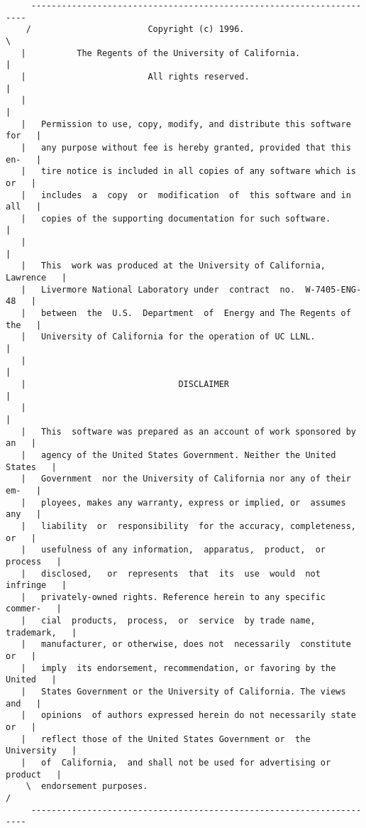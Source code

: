 \begin{verbatim}
     ---------------------------------------------------------------------  
    /                       Copyright (c) 1996.                           \ 
   |          The Regents of the University of California.                 |
   |                        All rights reserved.                           |
   |                                                                       |
   |   Permission to use, copy, modify, and distribute this software for   |
   |   any purpose without fee is hereby granted, provided that this en-   |
   |   tire notice is included in all copies of any software which is or   |
   |   includes  a  copy  or  modification  of  this software and in all   |
   |   copies of the supporting documentation for such software.           |
   |                                                                       |
   |   This  work was produced at the University of California, Lawrence   |
   |   Livermore National Laboratory under  contract  no.  W-7405-ENG-48   |
   |   between  the  U.S.  Department  of  Energy and The Regents of the   |
   |   University of California for the operation of UC LLNL.              |
   |                                                                       |
   |                              DISCLAIMER                               |
   |                                                                       |
   |   This  software was prepared as an account of work sponsored by an   |
   |   agency of the United States Government. Neither the United States   |
   |   Government  nor the University of California nor any of their em-   |
   |   ployees, makes any warranty, express or implied, or  assumes  any   |
   |   liability  or  responsibility  for the accuracy, completeness, or   |
   |   usefulness of any information,  apparatus,  product,  or  process   |
   |   disclosed,   or  represents  that  its  use  would  not  infringe   |
   |   privately-owned rights. Reference herein to any specific  commer-   |
   |   cial  products,  process,  or  service  by trade name, trademark,   |
   |   manufacturer, or otherwise, does not  necessarily  constitute  or   |
   |   imply  its endorsement, recommendation, or favoring by the United   |
   |   States Government or the University of California. The views  and   |
   |   opinions  of authors expressed herein do not necessarily state or   |
   |   reflect those of the United States Government or  the  University   |
   |   of  California,  and shall not be used for advertising or product   |
    \  endorsement purposes.                                              / 
     ---------------------------------------------------------------------
\end{verbatim}




